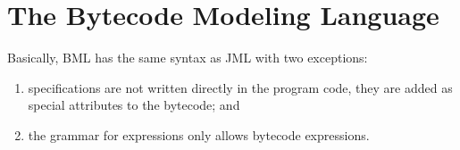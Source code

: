 \section{The Bytecode Modeling Language}
\label{SecBML}



Basically, BML has the same syntax as JML with two exceptions:
\begin{enumerate}
\item specifications are not written directly in the program code,
they are added as special attributes to the bytecode; and
\item the grammar for expressions only allows bytecode expressions.
\end{enumerate}

